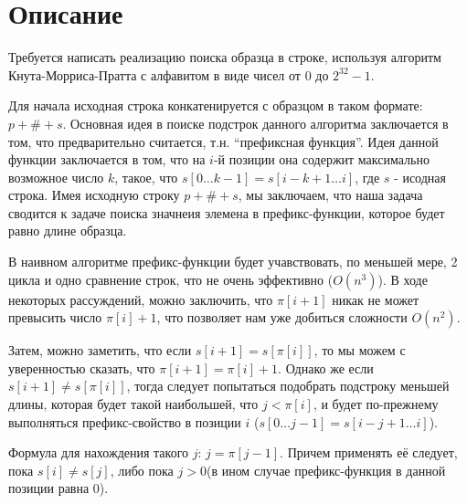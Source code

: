 \section{Описание}
Требуется написать реализацию поиска образца в строке, используя алгоритм Кнута-Морриса-Пратта с алфавитом в виде чисел от $0$ до $2^{32}-1$.

Для начала исходная строка конкатенируется с образцом в таком формате: $p + \# + s$.
Основная идея в поиске подстрок данного алгоритма заключается в том, что предварительно считается, т.н. \enquote{префиксная функция}.
Идея данной функции заключается в том, что на $i$-й позиции она содержит максимально возможное число $k$, такое, что
$s[0\dots{}k-1] = s[i-k+1\dots{}i]$, где $s$ - исодная строка.
Имея исходную строку $p + \# + s$, мы заключаем, что наша задача сводится к задаче поиска значнеия элемена в префикс-функции,
которое будет равно длине образца.

В наивном алгоритме префикс-функции будет учавствовать, по меньшей мере, 2 цикла и одно сравнение строк, что не очень эффективно ($O(n^3)$).
В ходе некоторых рассуждений, можно заключить, что $\pi[i+1]$ никак не может превысить число $\pi[i] + 1$,
что позволяет нам уже добиться сложности $O(n^2)$.

Затем, можно заметить, что если $s[i+1] = s[\pi[i]]$, то мы можем с уверенностью сказать, что $\pi[i+1] = \pi[i] + 1$.
Однако же если $s[i+1] \neq s[\pi[i]]$, тогда следует попытаться подобрать подстроку меньшей длины, которая будет такой наибольшей, что $j<\pi[i]$,
и будет по-прежнему выполняться префикс-свойство в позиции $i$ ($s[0\dots{}j-1] = s[i-j+1\dots{}i]$).

Формула для нахождения такого $j$: $j=\pi[j-1]$. Причем применять её следует, пока $s[i] \neq s[j]$, либо пока $j > 0$(в ином случае префикс-функция в данной позиции равна $0$).
\pagebreak

